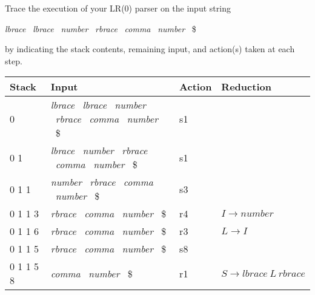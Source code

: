 \documentclass[10pt]{article}
\begin{document}
Trace the execution of your LR(0) parser on the input string
\begin{center}
\emph{lbrace}  ~\emph{lbrace}  ~\emph{number}  ~\emph{rbrace}
 ~\emph{comma}  ~\emph{number} ~\$
\end{center}
by indicating the stack contents, remaining input, and
action(s) taken at each step.

\begin{table}[h]
  \centering
  \begin{tabular}{l|l|l|l}
    \toprule
    Stack                             & Input                                                         & Action & Reduction                                              \\
    \midrule
    0                                 & \emph{lbrace}  ~\emph{lbrace}  ~\emph{number}  ~\emph{rbrace}
    ~\emph{comma}  ~\emph{number} ~\$ & s1                                                            &                                                                 \\
    0 1                               & \emph{lbrace}  ~\emph{number}  ~\emph{rbrace}
    ~\emph{comma}  ~\emph{number} ~\$ & s1                                                            &                                                                 \\
    0 1 1                             & \emph{number}  ~\emph{rbrace}
    ~\emph{comma}  ~\emph{number} ~\$ & s3                                                            &                                                                 \\
    0 1 1 3                           & \emph{rbrace} ~\emph{comma}  ~\emph{number} ~\$               & r4     & $I \rightarrow \mathit{number}$                        \\
    0 1 1 6                           & \emph{rbrace} ~\emph{comma}  ~\emph{number} ~\$               & r3     & $L \rightarrow I$                                      \\
    0 1 1 5                           & \emph{rbrace} ~\emph{comma}  ~\emph{number} ~\$               & s8     &                                                        \\
    0 1 1 5 8                         & \emph{comma}  ~\emph{number} ~\$                              & r1     & $S \rightarrow \mathit{lbrace} \  L \ \mathit{rbrace}$ \\

\end{tabular}
\end{table}
\end{document}
